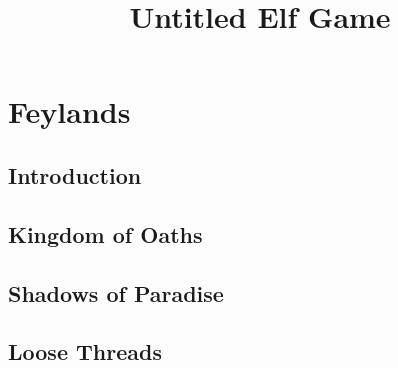 \documentclass[a4paper,openany]{book}
\title{Untitled Elf Game}
\begin{document}
%

\glsunsetall

\label{mainGlossary}
\printglossary[
  style=topicmcols,
  nonumberlist,
  ]

\label{mechanicsGlossary}
\printglossary[
  type=mech,
  style=topicmcols,
  nonumberlist,
  ]

\printglossary[
  type=people,
  style=topicmcols,
  nonumberlist,
  ]

\mainmatter
\glsresetall

\chapter{Feylands}

\section{Introduction}

\begin{multicols}{2}





\end{multicols}

\section{Kingdom of Oaths}



\section{Shadows of Paradise}





\section{Loose Threads}

\begin{multicols}{2}







\stopcontents[sq]

\end{multicols}

%



\begin{multicols}{2}



\end{multicols}

\backmatter

\cleardoublepage
\end{document}
